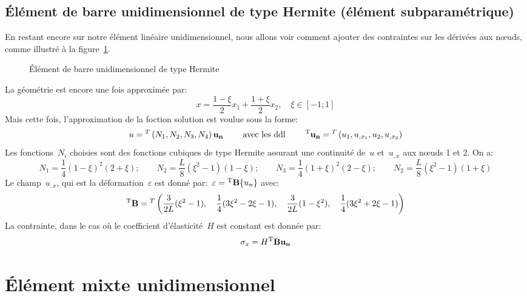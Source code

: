   \subsection{Élément de barre unidimensionnel de type Hermite (élément subparamétrique)}
\fi
En restant encore sur notre élément linéaire unidimensionnel, nous allons voir comment ajouter des
contraintes sur les dérivées aux nœuds, comme illustré à la figure~\ref{fig-ex2Her}.
\begin{figure}[ht]\centering
{} \hspace{5em}
\caption{Élément de barre unidimensionnel de type Hermite}\label{fig-ex2Her}
\end{figure}
\medskipvm
La géométrie est encore une fois approximée par:
\begin{equation} x=\frac{1-\xi}2 x_1 + \frac{1+\xi}2 x_2, \quad \xi\in[-1;1] \end{equation}
\medskipvm
Mais cette fois, l'approximation de la foction solution est voulue sous la forme:
\begin{equation}
u = \LLL{N_1, N_2, N_3, N_4}\VV{u_n} \qquad \text{ avec les ddl } \qquad
\LL{u_n}=\LLL{u_1, u_{,x_1}, u_2, u_{,x_2}} 
\end{equation}
\medskipvm
Les fonctions~$N_i$ choisies sont des fonctions cubiques de type Hermite assurant une continuité
de~$u$ et~$u_{,x}$ aux nœuds 1 et 2. On a:
\begin{equation}
N_1=\frac14(1-\xi)^2(2+\xi); \qquad
N_2=\frac{L}8(\xi^2-1)(1-\xi); \qquad
N_3=\frac14(1+\xi)^2(2-\xi); \qquad
N_2=\frac{L}8(\xi^2-1)(1+\xi)
\end{equation}
\medskipvm
Le champ~$u_{,x}$, qui est la déformation~$\varepsilon$ est donné par:~$\varepsilon={}^\mathrm{T}\mathbf{B}\{u_n\}$ avec:
\begin{equation} {}^\mathrm{T}\mathbf{B}={}^T\left( \frac3{2L}(\xi^2-1), \quad \frac14(3\xi^2-2\xi-1), \quad \frac3{2L}(1-\xi^2), \quad
\frac14(3\xi^2+2\xi-1)\right)\end{equation}
\medskipvm
La contrainte, dans le cas où le coefficient d'élasticité~$H$ est constant est
donnée par:
\begin{equation}\sigma_x=H \LL{B}\VV{u_n}\end{equation}
\medskipvm
\ifVersionAvecExemplesSepares
  \section{Élément mixte unidimensionnel}
\else
